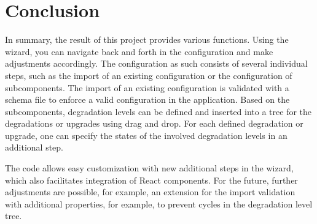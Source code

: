 \chapter{Conclusion}

In summary, the result of this project provides various functions. Using the wizard, you can navigate back and forth in the configuration and make adjustments accordingly. The configuration as such consists of several individual steps, such as the import of an existing configuration or the configuration of subcomponents. The import of an existing configuration is validated with a schema file to enforce a valid configuration in the application. Based on the subcomponents, degradation levels can be defined and inserted into a tree for the degradations or upgrades using drag and drop. For each defined degradation or upgrade, one can specify the states of the involved degradation levels in an additional step.

The code allows easy customization with new additional steps in the wizard, which also facilitates integration of React components. For the future, further adjustments are possible, for example, an extension for the import validation with additional properties, for example, to prevent cycles in the degradation level tree.  
